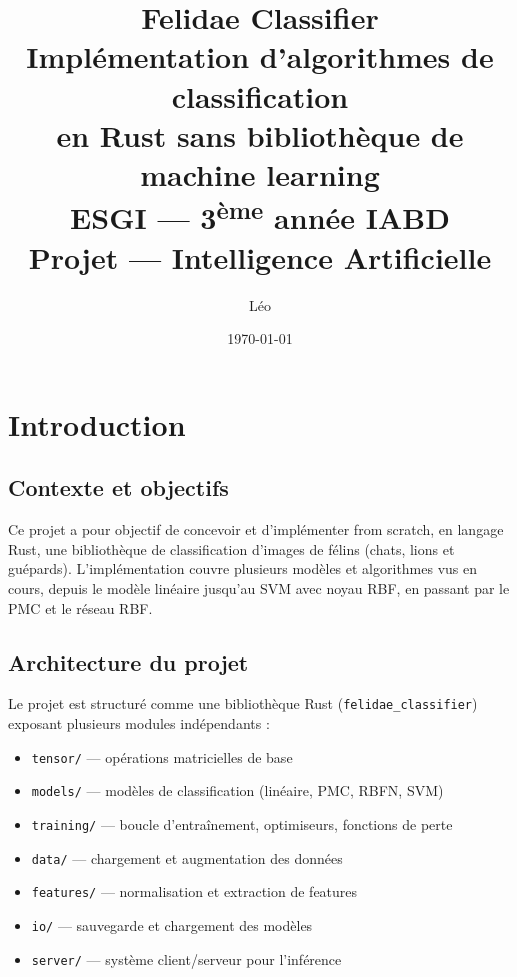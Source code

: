 \documentclass[12pt, a4paper]{report}
\title{
    \vspace{2cm}
    \Huge\textbf{Felidae Classifier} \\[0.5cm]
    \Large Implémentation d'algorithmes de classification \\
    en Rust sans bibliothèque de machine learning \\[1cm]
    \large ESGI — 3\textsuperscript{ème} année IABD \\[0.5cm]
    \normalsize Projet — Intelligence Artificielle
    \vspace{1cm}
}
\author{Léo}
\date{\today}
\begin{document}
\maketitle
\thispagestyle{empty}

\tableofcontents
\newpage

\chapter{Introduction}

\section{Contexte et objectifs}


Ce projet a pour objectif de concevoir et d'implémenter from scratch,
en langage Rust, une bibliothèque de classification d'images de félins
(chats, lions et guépards). L'implémentation couvre plusieurs modèles
et algorithmes vus en cours, depuis le modèle linéaire jusqu'au SVM avec
noyau RBF, en passant par le PMC et le réseau RBF.

\section{Architecture du projet}


Le projet est structuré comme une bibliothèque Rust (\texttt{felidae\_classifier})
exposant plusieurs modules indépendants :

\begin{itemize}
    \item \texttt{tensor/} — opérations matricielles de base
    \item \texttt{models/} — modèles de classification (linéaire, PMC, RBFN, SVM)
    \item \texttt{training/} — boucle d'entraînement, optimiseurs, fonctions de perte
    \item \texttt{data/} — chargement et augmentation des données
    \item \texttt{features/} — normalisation et extraction de features
    \item \texttt{io/} — sauvegarde et chargement des modèles
    \item \texttt{server/} — système client/serveur pour l'inférence
\end{itemize}
\end{document}
